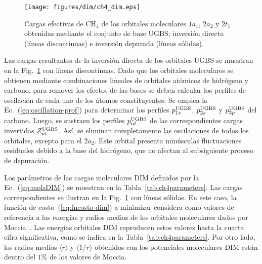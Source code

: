 \begin{figure}[t]
\centering
\texttt{[image: figures/dim/ch4\_dim.eps]}
\caption[Cargas invertidas y depuradas de metano.]
{Cargas efectivas de CH$_4$ de los orbitales moleculares $1a_1$, $2a_2$ 
y $2t_1$ obtenidas mediante el conjunto de base UGBS; inversión directa 
(líneas discontinuas) e inversión depurada (líneas sólidas).}
\label{fig:ch4zeff}
\end{figure}

Las cargas resultantes de la inversión directa de los orbitales UGBS 
se muestran en la Fig.~\ref{fig:ch4zeff} con líneas discontinuas. Dado 
que los orbitales moleculares se obtienen mediante combinaciones 
lineales de orbitales atómicos de hidrógeno y carbono, para remover los 
efectos de las bases se deben calcular los perfiles de oscilación de 
cada uno de los átomos constituyentes. Se emplea la 
Ec.~(\ref{eq:oscillation-prof}) para determinar los perfiles 
$p_{1s}^{\mbox{\scriptsize UGBS}}$, $p_{2s}^{\mbox{\scriptsize UGBS}}$ y 
$p_{2p}^{\mbox{\scriptsize UGBS}}$ del carbono. Luego, se sustraen los 
perfiles $p_{nl}^{\mbox{\scriptsize UGBS}}$ de las correspondientes 
cargas invertidas $Z_{nl}^{\mbox{\scriptsize UGBS}}$. Así, se eliminan 
completamente las oscilaciones de todos los orbitales, excepto para el 
$2a_2$. Este orbital presenta minúsculas fluctuaciones residuales debido 
a la base del hidrógeno, que no afectan al subsiguiente proceso de 
depuración.

Los parámetros de las cargas moleculares DIM definidos por la 
Ec.~(\ref{eq:molzDIM}) se muestran en la Tabla~\ref{tab:ch4parameters}. 
Las cargas correspondientes se ilustran en la Fig.~\ref{fig:ch4zeff} con 
líneas sólidas. En este caso, la función de costo~(\ref{eq:fncosto-dim}) 
a minimizar considera como valores de referencia a las energías y radios 
medios de los orbitales moleculares dados por Moccia~\cite{Moccia:69}. 
Las energías orbitales DIM reproducen estos valores hasta la cuarta 
cifra significativa, como se indica en la Tabla~\ref{tab:ch4parameters}. 
Por otro lado, los radios medios $\langle r\rangle$ y 
$\langle 1/r\rangle$ obtenidos con los potenciales moleculares DIM están 
dentro del $1\%$ de los valores de Moccia.

